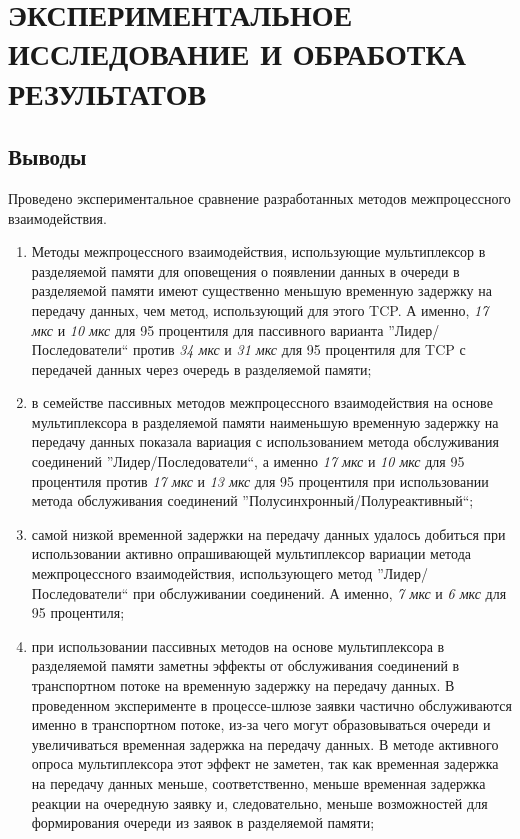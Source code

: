 \chapter{ЭКСПЕРИМЕНТАЛЬНОЕ ИССЛЕДОВАНИЕ И ОБРАБОТКА РЕЗУЛЬТАТОВ}\label{chapter41}





\section{Выводы}

Проведено экспериментальное сравнение разработанных методов межпроцессного взаимодействия.
\begin{enumerate}
\item Методы межпроцессного взаимодействия, использующие мультиплексор в разделяемой памяти для оповещения о появлении данных в очереди в разделяемой памяти имеют существенно меньшую временную задержку на передачу данных, чем метод, использующий для этого TCP. А именно, \textit{17 мкс} и \textit{10 мкс} для 95 процентиля для пассивного варианта ''Лидер/Последователи`` против \textit{34 мкс} и \textit{31 мкс} для 95 процентиля для TCP с передачей данных через очередь в разделяемой памяти;
\item в семействе пассивных методов межпроцессного взаимодействия на основе мультиплексора в разделяемой памяти наименьшую временную задержку на передачу данных показала вариация с использованием метода обслуживания соединений ''Лидер/Последователи``, а именно \textit{17 мкс} и \textit{10 мкс} для 95 процентиля против \textit{17 мкс} и \textit{13 мкс} для 95 процентиля при использовании метода обслуживания соединений ''Полусинхронный/Полуреактивный``;
\item самой низкой временной задержки на передачу данных удалось добиться при использовании активно опрашивающей мультиплексор вариации метода межпроцессного взаимодействия, использующего метод ''Лидер/Последователи`` при обслуживании соединений. А именно, \textit{7 мкс} и \textit{6 мкс} для 95 процентиля;
\item при использовании пассивных методов на основе мультиплексора в разделяемой памяти заметны эффекты от обслуживания соединений в транспортном потоке на временную задержку на передачу данных. В проведенном эксперименте в процессе-шлюзе заявки частично обслуживаются именно в транспортном потоке, из-за чего могут образовываться очереди и увеличиваться временная задержка на передачу данных. В методе активного опроса мультиплексора этот эффект не заметен, так как временная задержка на передачу данных меньше, соответственно, меньше временная задержка реакции на очередную заявку и, следовательно, меньше возможностей для формирования очереди из заявок в разделяемой памяти;

\end{enumerate}
